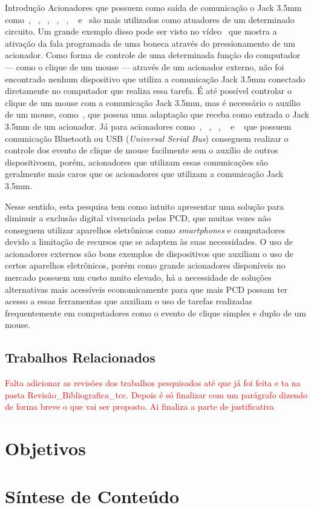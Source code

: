 \begin{chapter}{Introdução}
Acionadores que possuem como saída de comunicação o Jack 3.5mm
como~\cite{CandyCorn}, ~\cite{PalPad}, ~\cite{JellyBean}, ~\cite{Chin}, ~\cite{
MicroLight}, ~\cite{HoneyBee} e~\cite{StringSwitch} são mais utilizados como
atuadores de um determinado circuito. Um grande exemplo disso pode ser visto
no vídeo~\cite{ATswitchYT} que mostra a ativação da fala programada de uma
boneca através do pressionamento de um acionador. Como forma de controle de uma
determinada função do computador --- como o clique de um mouse --- através de um 
acionador externo, não foi encontrado nenhum dispositivo que utiliza a comunicação Jack 3.5mm conectado
diretamente no computador que realiza essa tarefa. É até possível controlar o
clique de um mouse com a comunicação Jack 3.5mm, mas é necessário o auxílio de
um mouse, como~\cite{MouseJack}, que possua uma adaptação que receba como
entrada o Jack 3.5mm de um acionador. Já para acionadores
como~\cite{Blue2}, ~\cite{SavantElite2}, ~\cite{FootPedal}, ~\cite{FootSwitch} e
~\cite{SipPuff} que possuem comunicação Bluetooth ou USB (\textit{Universal
Serial Bus}) conseguem realizar o controle dos evento de clique de mouse
facilmente sem o auxílio de outros dispositivosm, porém, acionadores que
utilizam essas comunicações são geralmente mais caros que os acionadores que
utilizam a comunicação Jack 3.5mm.

Nesse sentido, esta pesquisa tem como intuito apresentar uma solução para
diminuir a exclusão digital vivenciada pelas PCD, que muitas vezes não conseguem
utilizar aparelhos eletrônicos como \textit{smartphones} e computadores devido a 
limitação de recursos que se adaptem às suas necessidades. O uso de
acionadores externos são bons exemplos de dispositivos que auxiliam o uso de certos
aparelhos eletrônicos, porém como grande acionadores disponíveis no mercado 
possuem um custo muito elevado, há a necessidade de soluções alternativas mais
acessíveis economicamente para que mais PCD possam ter acesso a essas
ferramentas que auxiliam o uso de tarefas realizadas frequentemente em
computadores como o evento de clique simples e duplo de um mouse.  

\subsection{Trabalhos Relacionados}

\textcolor{red}{Falta adicionar as revisões dos trabalhos pesquisados até que já foi feita e ta
na pasta Revisão\_Bibliografica\_tcc. Depois é só finalizar com um parágrafo
dizendo de forma breve o que vai ser proposto. Ai finaliza a parte de
justificativa}
\section{Objetivos}

\section{Síntese de Conteúdo}


\end{chapter}

